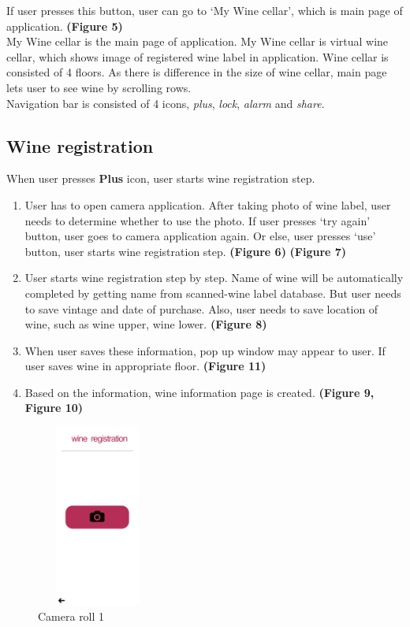 \documentclass[sigconf, nonacm]{acmart}
\begin{document}
If user presses this button, user can go to ‘My Wine
cellar’, which is main page of application.
\textbf{(Figure 5)}\\

My Wine cellar is the main page of application. My Wine
cellar is virtual wine cellar, which shows image of registered
wine label in application. Wine cellar is consisted of 4 floors.
As there is difference in the size of wine cellar, main page
lets user to see wine by scrolling rows.\\
Navigation bar is consisted of 4 icons, \textit{plus}, \textit{lock}, \textit{alarm}
and \textit{share}.\\

\noindent \subsection{Wine registration}
When user presses \textbf{Plus} icon,
user starts wine registration step.\\

\begin{enumerate}


    \item User has to open camera application. After
taking photo of wine label, user needs to
determine whether to use the photo. If user
presses ‘try again’ button, user goes to camera
application again. Or else, user presses ‘use’
button, user starts wine registration step.
\textbf{(Figure 6)} \textbf{(Figure 7)}
\item User starts wine registration step by step.
Name of wine will be automatically completed
by getting name from scanned-wine label
database. But user needs to save vintage and
date of purchase. Also, user needs to save
location of wine, such as wine upper, wine lower. \textbf{(Figure 8)}
\item When user saves these information, pop up window
may appear to user. If user saves wine in appropriate floor. \textbf{(Figure 11)}
\item Based on the information, wine information page is created. \textbf{(Figure 9, Figure 10)}
\end{enumerate}

\begin{figure}
  \centering
  \includegraphics[width=4cm, height=6cm]{camera.png}
  \caption{Camera roll 1}
  \label{fig:My Winecellar}
\end{figure}
\end{document}
